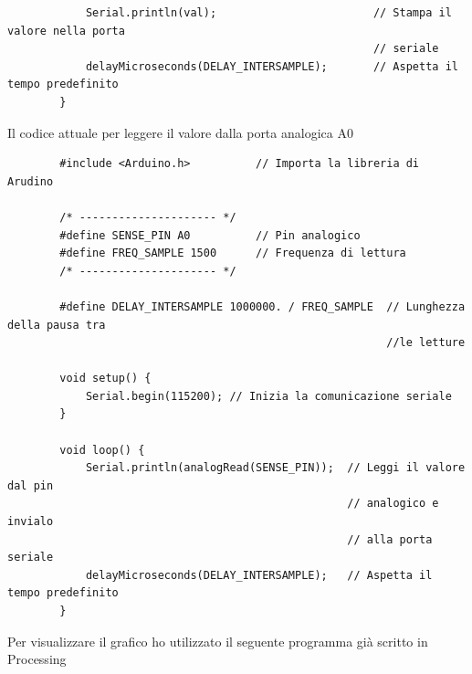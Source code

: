 \documentclass[a4paper, 10pt, final]{article} %
\newcommand{\parenciteit}[2]{\textit{\parencite[#1]{#2}}} %
\begin{document}
\begin{verbatim}
            Serial.println(val);                        // Stampa il valore nella porta
                                                        // seriale
            delayMicroseconds(DELAY_INTERSAMPLE);       // Aspetta il tempo predefinito
        }
    \end{verbatim}

    \noindent Il codice attuale per leggere il valore dalla porta analogica A0
    \begin{verbatim}
        #include <Arduino.h>          // Importa la libreria di Arudino

        /* --------------------- */
        #define SENSE_PIN A0          // Pin analogico
        #define FREQ_SAMPLE 1500      // Frequenza di lettura
        /* --------------------- */

        #define DELAY_INTERSAMPLE 1000000. / FREQ_SAMPLE  // Lunghezza della pausa tra
                                                          //le letture

        void setup() {
            Serial.begin(115200); // Inizia la comunicazione seriale
        }

        void loop() {
            Serial.println(analogRead(SENSE_PIN));  // Leggi il valore dal pin 
                                                    // analogico e invialo
                                                    // alla porta seriale
            delayMicroseconds(DELAY_INTERSAMPLE);   // Aspetta il tempo predefinito
        }
    \end{verbatim}

    Per visualizzare il grafico ho utilizzato il seguente programma gi\`{a} scritto in Processing \parenciteit{}{ProcessingGrapher:Software}
\end{document}
